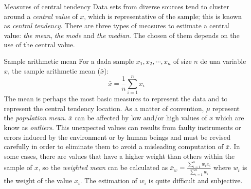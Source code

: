 \documentclass[8pt]{beamer}
\begin{document}
\begin{frame}{Measures of central tendency}
    Data sets from diverse sources tend to cluster around a \emph{central value} of $x$, which is representative of the sample; this is known as \emph{central tendency}. There are three types of measures to estimate a central value: \emph{the mean}, \emph{the mode} and \emph{the median}. The chosen of them depends on the use of the central value.
    \begin{block}{Sample arithmetic mean}
    For a dada sample $x_1, x_2, \cdots, x_n$ of size $n$ de una variable $x$, the sample arithmetic mean ($\bar{x}$):
      $$
      \bar{x} = \frac{1}{n} \sum_{i=1}^n x_i
      $$
      The mean is perhaps the most basic measures to represent the data and to represent the central tendency location. As a matter of convention, $\mu$ represent the \emph{population mean}. $\bar{x}$ can be affected by low and/or high values of $x$ which are know as \emph{outliers}. This unexpected values can results from faulty instruments or errors induced by the environment or by human beings and must be revised carefully in order to eliminate them to avoid a misleading computation of $\bar{x}$. In some cases, there are values that have a higher weight than others within the sample of $x$, so the \emph{weighted mean} can be calculated as $ \bar{x}_w = \frac{\sum_{i=1}^n w_i x_i}{ \sum_{i=1}^n w_i}$ where $w_i$ is the weight of the value $x_i$. The estimation of $w_i$ is quite difficult and subjective.  
    \end{block}
\end{frame}
\end{document}
